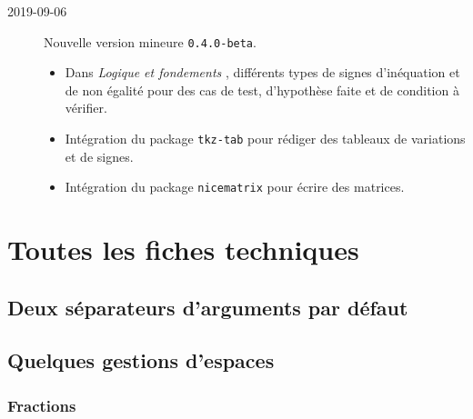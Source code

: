 \documentclass[12pt,a4paper]{article}
\theoremstyle{definition}
\newcommand\extraspace{
	\vspace{0.25em}
}
\begin{document}
\begin{description}

    \medskip
    \item[2019-09-06] Nouvelle version mineure \verb+0.4.0-beta+.
    
    \begin{itemize}[itemsep=.5em]
        \item Dans \emph{\og Logique et fondements \fg}, différents types de signes d'inéquation et de non égalité pour des cas de test, d'hypothèse faite et de condition à vérifier.
    
    
        \item Intégration du package \verb+tkz-tab+ pour rédiger des tableaux de variations et de signes.
    
    
        \item Intégration du package \verb+nicematrix+ pour écrire des matrices.
    \end{itemize}


\end{description}


\newpage
\section{Toutes les fiches techniques}


\subsection{Deux séparateurs d'arguments par défaut}


\subsection{Quelques gestions d'espaces}

\subsubsection{Fractions}



\extraspace

\end{document}
